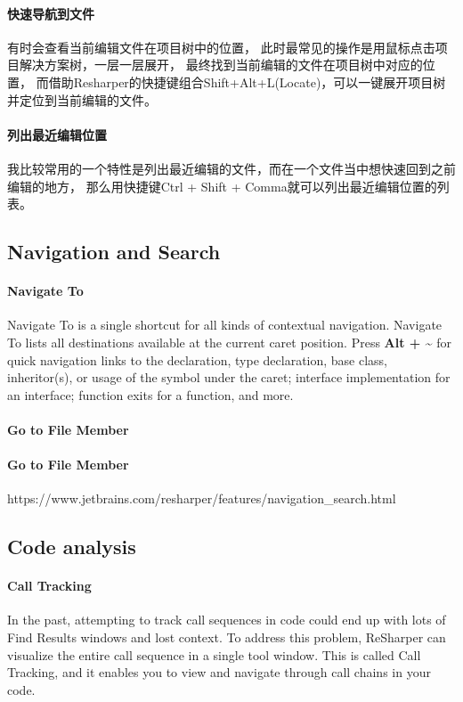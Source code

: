 \documentclass{book}
\begin{document}
\paragraph{快速导航到文件}有时会查看当前编辑文件在项目树中的位置，
此时最常见的操作是用鼠标点击项目解决方案树，一层一层展开，
最终找到当前编辑的文件在项目树中对应的位置，
而借助Resharper的快捷键组合Shift+Alt+L(Locate)，可以一键展开项目树并定位到当前编辑的文件。

\paragraph{列出最近编辑位置}

我比较常用的一个特性是列出最近编辑的文件，而在一个文件当中想快速回到之前编辑的地方，
那么用快捷键Ctrl + Shift + Comma就可以列出最近编辑位置的列表。

\subsection{Navigation and Search}

\paragraph{Navigate To}Navigate To is a single shortcut for all kinds of contextual navigation. 
Navigate To lists all destinations available at the current caret position. 
Press \textbf{Alt + \~} for quick navigation links to the declaration, 
type declaration, base class, inheritor(s), or usage of the symbol under the caret; 
interface implementation for an interface; function exits for a function, and more.

\paragraph{Go to File Member}


\paragraph{Go to File Member}


https://www.jetbrains.com/resharper/features/navigation\_search.html


\subsection{Code analysis}

\paragraph{Call Tracking}In the past, attempting to track call sequences in code could end up with lots of Find Results windows and lost context. 
To address this problem, ReSharper can visualize the entire call sequence in a single tool window. This is called Call Tracking, 
and it enables you to view and navigate through call chains in your code.
\end{document}
